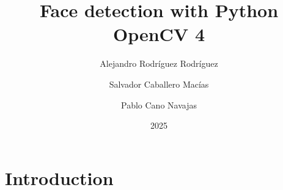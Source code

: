 \documentclass{article}
\title{Face detection with Python OpenCV 4}
\author{
    Alejandro Rodríguez Rodríguez \and Salvador Caballero Macías \and Pablo Cano Navajas
}
\date{2025}
\begin{document}
\maketitle

\newpage

\section{Introduction}
\end{document}
